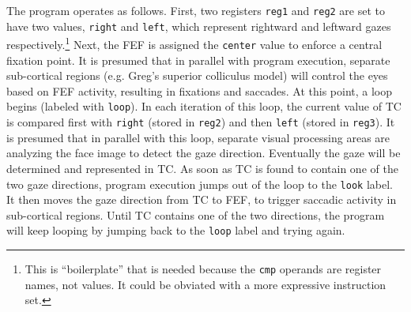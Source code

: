 \documentclass[pdftex,12pt,letterpaper]{article}
\begin{document}
The program operates as follows.  First, two registers \texttt{reg1} and \texttt{reg2} are set to have two values, \texttt{right} and \texttt{left}, which represent rightward and leftward gazes respectively.\footnote{This is ``boilerplate'' that is needed because the \texttt{cmp} operands are register names, not values.  It could be obviated with a more expressive instruction set.}  Next, the FEF is assigned the \texttt{center} value to enforce a central fixation point.  It is presumed that in parallel with program execution, separate sub-cortical regions (e.g. Greg's superior colliculus model) will control the eyes based on FEF activity, resulting in fixations and saccades.  At this point, a loop begins (labeled with \texttt{loop}).  In each iteration of this loop, the current value of TC is compared first with \texttt{right} (stored in \texttt{reg2}) and then \texttt{left} (stored in \texttt{reg3}).  It is presumed that in parallel with this loop, separate visual processing areas are analyzing the face image to detect the gaze direction.  Eventually the gaze will be determined and represented in TC.  As soon as TC is found to contain one of the two gaze directions, program execution jumps out of the loop to the \texttt{look} label.  It then moves the gaze direction from TC to FEF, to trigger saccadic activity in sub-cortical regions.  Until TC contains one of the two directions, the program will keep looping by jumping back to the \texttt{loop} label and trying again.
\end{document}
